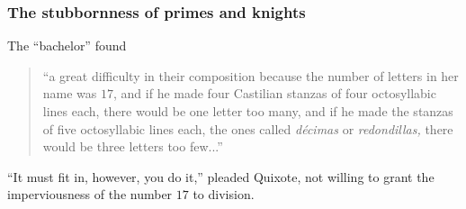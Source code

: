 \documentclass{beamer}
\begin{document}
\begin{frame}\frametitle{\bf The stubbornness of primes and knights}
The
``bachelor'' found
\vskip10pt

\begin{quote}
  ``a great difficulty in their composition because the number of
  letters in her name was $17$, and if he made four Castilian stanzas
  of four octosyllabic lines each, there would be one letter too many,
  and if he made the stanzas of five octosyllabic lines each, the ones
  called {\em d{\'e}cimas} or {\em redondillas,} there would be three
  letters too few...'' 
\end{quote}

``It must fit in, however, you do it,'' pleaded Quixote, not willing to
grant the imperviousness of the number $17$ to division.
\end{frame}
\end{document}
